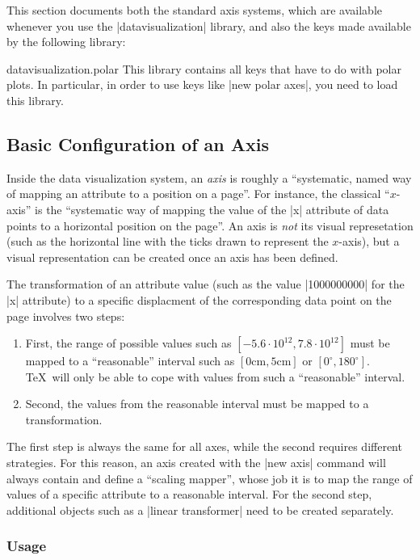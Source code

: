 This section documents both the standard axis systems, which are
available whenever you use the |datavisualization| library, and also
the keys made available by the following library:

\begin{tikzlibrary}{datavisualization.polar}
  This library contains all keys that have to do with polar plots. In
  particular, in order to use keys like |new polar axes|, you need to
  load this library.
\end{tikzlibrary}


\subsection{Basic Configuration of an Axis}
\label{section-dv-axes-main}

Inside the data visualization system, an \emph{axis} is roughly a
``systematic, named way of mapping an attribute to a 
position on a page''. For instance, the classical ``$x$-axis'' is the
``systematic way of mapping the value of the |x| attribute of data
points to a horizontal position on the page''. An axis is \emph{not}
its visual represetation (such as the horizontal line with the ticks
drawn to represent the $x$-axis), but a visual representation can be
created once an axis has been defined.

The transformation of an attribute value (such as the value |1000000000|
for the |x| attribute) to a specific displacment of the corresponding
data point on the page involves two steps:
\begin{enumerate}
\item First, the range of possible values such as $[-5.6\cdot
  10^{12},7.8\cdot 10^{12}]$ must be mapped to a ``reasonable''
  interval such as $[0\mathrm{cm},5\mathrm{cm}]$ or
  $[0^\circ,180^\circ]$. \TeX\ will only be able to cope with values
  from such a ``reasonable'' interval.
\item Second, the values from the reasonable interval must be mapped
  to a transformation.
\end{enumerate}
The first step is always the same for all axes, while the second
requires different strategies. For this reason, an axis created with
the |new axis| command will always contain and define a ``scaling
mapper'', whose job it is to map the range of values of a specific
attribute to a reasonable interval. For the second step, additional
objects such as a |linear transformer| need to be created separately.  


\subsubsection{Usage}

